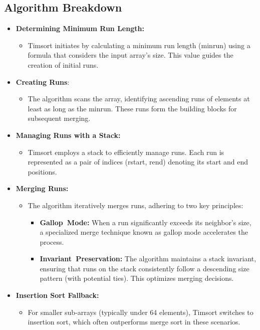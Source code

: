 \documentclass[a4paper, 9pt, twocolumn]{article}
\begin{document}
\subsection*{Algorithm Breakdown}
\begin{itemize}
	\item \textbf{{Determining Minimum Run Length:}}\\
	\vspace{-5mm}
	      \begin{itemize}[label={$\circ$}]
		      \item Timsort initiates by calculating a minimum run length (minrun) using a formula that considers the input array's size. This value guides the creation of initial runs.
	      \end{itemize}
	\item \textbf{{Creating Runs}}:
	      \begin{itemize}[label={$\circ$}]
		      \item The algorithm scans the array, identifying ascending runs of elements at least as long as the minrun. These runs form the building blocks for subsequent merging.
	      \end{itemize}
	\item \textbf{{Managing Runs with a Stack:}}
	      \begin{itemize}[label={$\circ$}]
		      \item Timsort employs a stack to efficiently manage runs. Each run is represented as a pair of indices (rstart, rend) denoting its start and end positions.
	      \end{itemize}
	\item \textbf{{Merging Runs:}}
	      \begin{itemize}[label={$\circ$}]
		      \item The algorithm iteratively merges runs, adhering to two key principles:
		            \begin{itemize}[label={$\star$}]
			            \item \textbf{Gallop~Mode:} When a run significantly exceeds its neighbor's size, a specialized merge technique known as gallop mode accelerates the process.
			            \item \textbf{Invariant~Preservation:} The algorithm maintains a stack invariant, ensuring that runs on the stack consistently follow a descending size pattern (with potential ties). This optimizes merging decisions.
		            \end{itemize}
	      \end{itemize}
	\item \textbf{{Insertion Sort Fallback:}}
	      \begin{itemize}[label={$\circ$}]
		      \item For smaller sub-arrays (typically under 64 elements), Timsort switches to insertion sort, which often outperforms merge sort in these scenarios.
	      \end{itemize}
\end{itemize}
\end{document}

